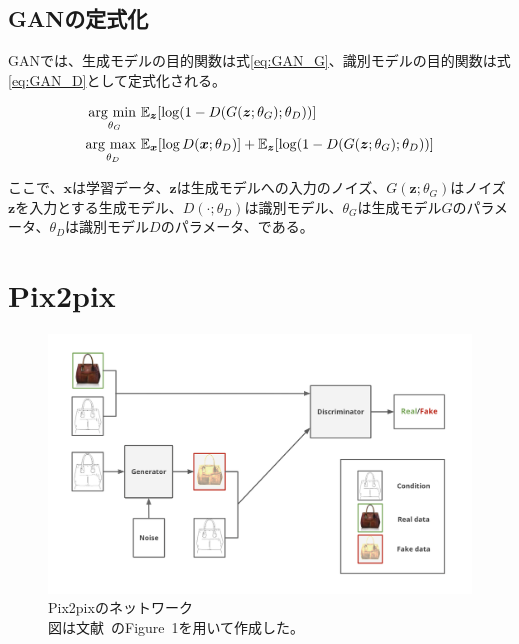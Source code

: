 \subsection{GANの定式化}

GANでは、生成モデルの目的関数は式\ref{eq:GAN_G}、識別モデルの目的関数は式\ref{eq:GAN_D}として定式化される。

\begin{align}
    \label{eq:GAN_G}
    \mathop{\rm arg~min~}\limits _{\theta_G}& \mathbb{E}_{\boldsymbol{z}}[\log (1-D(G(\boldsymbol{z};\theta_G);\theta_D))]\\
    \label{eq:GAN_D}
    \mathop{\rm arg~max~}\limits _{\theta_D}& \mathbb{E}_{\boldsymbol{x}}[\log D(\boldsymbol{x};\theta_D)]+\mathbb{E}_{\boldsymbol{z}}[\log (1-D(G(\boldsymbol{z};\theta_G);\theta_D))]
\end{align}


ここで、$\boldsymbol{x}$は学習データ、$\boldsymbol{z}$は生成モデルへの入力のノイズ、$G(\boldsymbol{z};\theta_G)$はノイズ$\boldsymbol{z}$を入力とする生成モデル、$D(\cdot;\theta_D)$は識別モデル、$\theta_G$は生成モデル$G$のパラメータ、$\theta_D$は識別モデル$D$のパラメータ、である。

\section{Pix2pix}

\begin{figure}[t]
\begin{center}
\includegraphics[width=\hsize]{figure/pix2pix_net.png}
\caption{Pix2pixのネットワーク\\
図は文献~\cite{pix2pix}のFigure~1を用いて作成した。}
\label{fig:pix2pix_net}
\end{center}
\end{figure}

